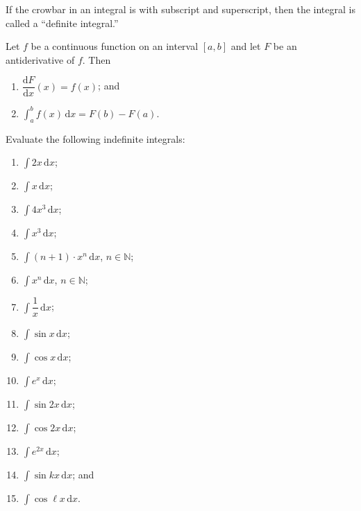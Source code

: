 \documentclass[11pt]{article}
\theoremstyle{break}
\theoremstyle{no_label}
\newcommand{\derivative}[2]{\dfrac{\dd{#1}}{\dd{#2}}}
\newcommand{\dd}{\text{d}}
\newcommand{\ddi}{\text{$\,$d}}
\newcommand{\bbN}{\mathbb{N}}
\numberwithin{equation}{theorem}
\begin{document}
\begin{remark}
    If the crowbar in an integral is with subscript and superscript, then the integral is called a ``definite integral.''
\end{remark}

\begin{theorem}
    Let $f$ be a continuous function on an interval $[a, b]$ and let $F$ be an antiderivative of $f$. Then
    \begin{enumerate}
        \item $\derivative{F}{x}(x)=f(x)$; and
        \item $\displaystyle\int_a^b f(x)\ddi x=F(b)-F(a)$.
    \end{enumerate}
\end{theorem}

\begin{example}
    Evaluate the following indefinite integrals:\vspace{-1.8em}
    \begin{multicols}{3}
        \begin{enumerate}
            \item $\displaystyle\int 2x\ddi x$;
            \item $\displaystyle\int x\ddi x$;
            \item $\displaystyle\int 4x^3\ddi x$;
            \item $\displaystyle\int x^3\ddi x$;
            \item $\displaystyle\int (n+1)\cdot x^n\ddi x$, $n\in\bbN$;
            \item $\displaystyle\int x^n\ddi x$, $n\in\bbN$;
            \item $\displaystyle\int \dfrac{1}{x}\ddi x$;
            \item $\displaystyle\int \sin x\ddi x$;
            \item $\displaystyle\int \cos x\ddi x$;
            \item $\displaystyle\int e^x\ddi x$;
            \item $\displaystyle\int \sin 2x\ddi x$;
            \item $\displaystyle\int \cos 2x\ddi x$;
            \item $\displaystyle\int e^{2x}\ddi x$;
            \item $\displaystyle\int \sin kx\ddi x$; and
            \item $\displaystyle\int \cos \ell x\ddi x$.
        \end{enumerate}
    \end{multicols}\vspace{0.1em}
\end{example}
\end{document}

